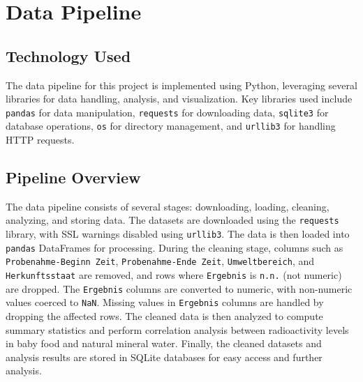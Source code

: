 \documentclass{article}
\begin{document}
\section{Data Pipeline}

\subsection{Technology Used}
The data pipeline for this project is implemented using Python, leveraging several libraries for data handling, analysis, and visualization. Key libraries used include \texttt{pandas} for data manipulation, \texttt{requests} for downloading data, \texttt{sqlite3} for database operations, \texttt{os} for directory management, and \texttt{urllib3} for handling HTTP requests.

\subsection{Pipeline Overview}
The data pipeline consists of several stages: downloading, loading, cleaning, analyzing, and storing data. The datasets are downloaded using the \texttt{requests} library, with SSL warnings disabled using \texttt{urllib3}. The data is then loaded into \texttt{pandas} DataFrames for processing. During the cleaning stage, columns such as \texttt{Probenahme-Beginn Zeit}, \texttt{Probenahme-Ende Zeit}, \texttt{Umweltbereich}, and \texttt{Herkunftsstaat} are removed, and rows where \texttt{Ergebnis} is \texttt{n.n.} (not numeric) are dropped. The \texttt{Ergebnis} columns are converted to numeric, with non-numeric values coerced to \texttt{NaN}. Missing values in \texttt{Ergebnis} columns are handled by dropping the affected rows. The cleaned data is then analyzed to compute summary statistics and perform correlation analysis between radioactivity levels in baby food and natural mineral water. Finally, the cleaned datasets and analysis results are stored in SQLite databases for easy access and further analysis.
\end{document}
